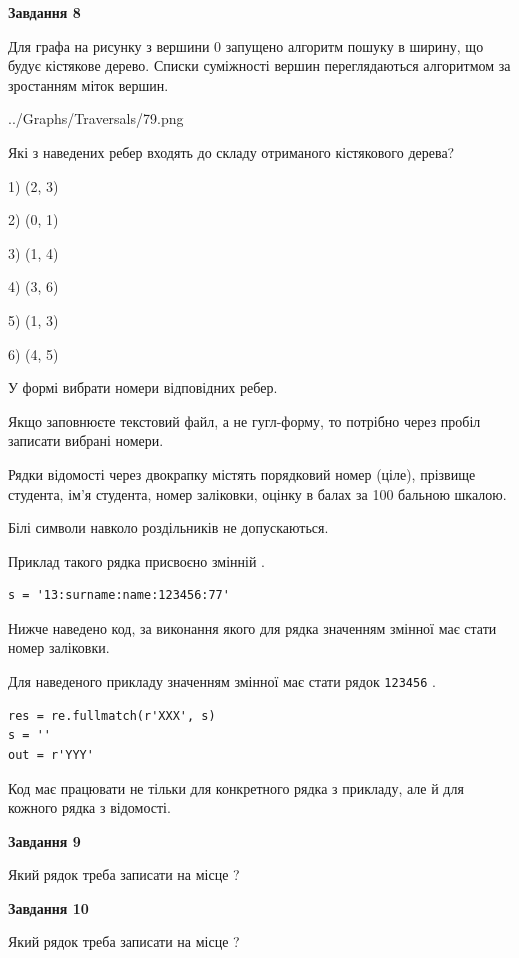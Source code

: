 \documentclass[12pt, ukrainian]{article}
\def\code#1{\Verb!#1!}
\begin{document}
{\begin {large}
{\begin {center}\textbf{Завдання 8}\end {center}}\par
Для графа на рисунку з вершини 0 запущено алгоритм пошуку в ширину, що будує кістякове дерево. Списки суміжності вершин переглядаються алгоритмом за зростанням міток вершин.\par
\begin{center}
	{../Graphs/Traversals/79.png}
\end{center}
\par Які з наведених ребер входять до складу отриманого кістякового дерева?\par
1) (2, 3)\par
2) (0, 1)\par
3) (1, 4)\par
4) (3, 6)\par
5) (1, 3)\par
6) (4, 5)\par
{\vskip 15pt} У формі вибрати номери відповідних ребер.


Якщо заповнюєте текстовий файл, а не гугл-форму, то потрібно через пробіл записа\-ти вибрані номери.\par
\newpage


Рядки відомості через двокрапку містять порядковий номер (ціле), пріз\-ви\-ще студен\-та, ім'я студента, номер заліковки, оцінку в балах за 100 бальною шкалою.

Білі символи навколо роздільників не допускаються.

Приклад такого рядка присвоєно змінній .



\begin{verbatim}
s = '13:surname:name:123456:77'
\end{verbatim}


Нижче наведено код, за виконання якого для рядка  значенням змінної  має стати номер заліковки.

Для наведеного прикладу значенням змінної  має стати рядок \code{123456} .



\begin{verbatim}
res = re.fullmatch(r'XXX', s)
s = ''
out = r'YYY'
\end{verbatim}


Код має працювати не тільки для конкретного рядка з прикладу, але й для кожного рядка з відомості.

{\begin {center}\textbf{Завдання 9}\end {center}}\par
Який рядок треба записати на місце  ?\par
\vspace{5mm}


{\begin {center}\textbf{Завдання 10}\end {center}}\par
Який рядок треба записати на місце  ?\par


\newpage


\end {large}}
\end{document}

